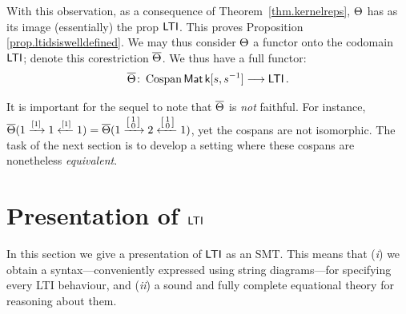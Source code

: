 With this observation, as a consequence of Theorem~\ref{thm.kernelreps},
$\Theta$ has as its image (essentially) the prop $\operatorname{\mathsf{LTI}}$. This proves
Proposition \ref{prop.ltidsiswelldefined}. We may thus consider $\Theta$ a
functor onto the codomain $\operatorname{\mathsf{LTI}}$; denote this corestriction $\overline{\Theta}$. We thus have a full functor:
\[
  \overline{\Theta} {\colon} \operatorname{{Cospan}}\operatorname{\mathsf{Mat}}{\mathsf{k}[s,s^{-1}]} \longrightarrow \operatorname{\mathsf{LTI}}.
\]

\begin{remark}\label{rmk:faithfulness}
It is important for the sequel to note that $\overline{\Theta}$ is \emph{not} faithful.
For instance, $\overline{\Theta}(1\xrightarrow{[1]}1\xleftarrow{[1]}1) =
\overline{\Theta}(1\xrightarrow{ \left[\begin{smallmatrix} 1\\ 0\end{smallmatrix}\right]
}2 \xleftarrow{ \left[\begin{smallmatrix} 1\\ 0\end{smallmatrix}\right]} 1)$, yet
the cospans are not isomorphic. The task of the next section is to develop a
setting where these cospans are nonetheless \emph{equivalent}.
\end{remark}

\section{Presentation of $\operatorname{\mathsf{LTI}}$} \label{sec.diagrams}
In this section we give a presentation of $\operatorname{\mathsf{LTI}}$ as an SMT. This means 
that (\emph{i}) we obtain a syntax---conveniently expressed using string
diagrams---for specifying every LTI behaviour, and (\emph{ii}) a sound and
fully complete equational theory for reasoning about them.

